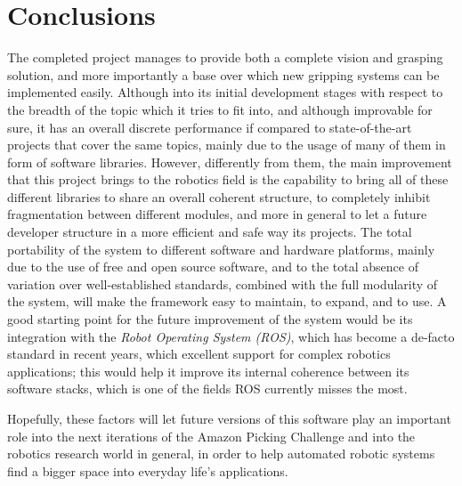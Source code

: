 \section{Conclusions}
The completed project manages to provide both a complete vision and
grasping solution, and more importantly a base over which new gripping
systems can be implemented easily. Although into its initial
development stages with respect to the breadth of the topic which it
tries to fit into, and although improvable for sure, it has an overall
discrete performance if compared to 
state-of-the-art projects that cover the same topics, mainly due to the usage of
many of them in form of software libraries. However, differently from
them, the main improvement that this project brings to the robotics
field is the capability to bring all of these different libraries to
share an overall coherent structure, to completely inhibit fragmentation between
different modules, and more in general to let a future developer
structure in a more efficient and safe way its projects. The total
portability of the system to different software and hardware
platforms, mainly due to the use of free and open source software, and
to the total absence of variation over well-established standards,
combined with the full modularity of the system, will
make the framework easy to maintain, to expand, and to use. A good
starting point for the future improvement of the system would be its
integration with the \emph{Robot Operating System (\emph{ROS})}, which
has become a de-facto standard in recent years, which excellent
support for complex robotics applications; this would help it improve
its internal coherence between its software stacks, which is one of
the fields ROS currently misses the most.

Hopefully, these factors will let future versions of this software play an
important role into the next iterations of the Amazon Picking
Challenge and into the robotics research world in general, in order to help
automated robotic systems find a bigger space into everyday life's applications.
